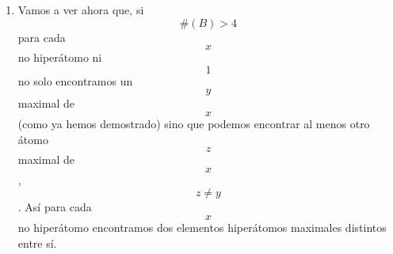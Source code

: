 \documentclass[
]{article}
\providecommand{\tightlist}{%
  \setlength{\itemsep}{0pt}\setlength{\parskip}{0pt}}
\begin{document}
\begin{enumerate}
\begin{enumerate}
\begin{enumerate}
\begin{enumerate}
\begin{enumerate}
          \begin{enumerate}
          \def\labelenumvi{\arabic{enumvi}.}
          \tightlist
          \item
            \[{y + \overline{y}} = 1\]
          \item
            \[{{x \cdot {({y + \overline{y}})}} = {x \cdot 1}} = x\]
          \item
            \[{{x = {{({x \cdot y})} + {({x \cdot \overline{y}})}}} = {{({x \cdot y})} + 0}} = y\]
          \item
            \[x = y\]. Absurdo. Habíamos asumido que
            \[{y \in \mathit{Atom}}{{{(B)} \land x} \notin \mathit{Atom}}{(B)}\].
          \end{enumerate}
        \end{enumerate}
      \item
        \[{{({x \cdot \overline{y}})} \cdot x} = {({x \cdot \overline{y}})}\]
      \item
        \[\exists{z \in \mathit{Atom}}{(B)}{{z \cdot {({x \cdot \overline{y}})}} = z}\]
      \item
        \[z \neq y\]

        \begin{enumerate}
        \def\labelenumv{\arabic{enumv}.}
        \tightlist
        \item
          Supongamos \[z = y\].
        \item
          \[{y = z} = {{({x \cdot \overline{y}})} \cdot z}\]
        \item
          \[{{{y = {{({{({x \cdot \overline{y}})} \cdot z})} \cdot y}} = {{({x \cdot z})} \cdot {({\overline{y} \cdot y})}}} = {{({x \cdot z})} \cdot 0}} = 0\]
        \item
          \[0 = y\]. Absurdo. Habíamos asumido que
          \[{y \in {B^{\ast} \land 0}} \notin B^{\ast}\].
        \end{enumerate}
      \item
        \[\exists{z \in {B \smallsetminus {\{ y\}}}}z\mathsf{\mathit{minimal}}x\].
      \item
        \[\exists{\mathit{yz} \in B}{{\left\lbrack {y\mathsf{\mathit{minimal}}x} \right\rbrack \land \left\lbrack {z\mathsf{\mathit{minimal}}x} \right\rbrack} \land \left\lbrack {y \neq x} \right\rbrack}\].
      \item
        \[\forall{x \in B^{\ast}}\exists{\mathit{yz} \in B}{{\left\lbrack {y\mathsf{\mathit{minimal}}x} \right\rbrack \land \left\lbrack {z\mathsf{\mathit{minimal}}x} \right\rbrack} \land \left\lbrack {y \neq x} \right\rbrack}\].
      \end{enumerate}
    \item
      Vamos a ver ahora que, si \[{\#{(B)}} > 4\] para cada \[x\] no
      hiperátomo ni \[1\] no solo encontramos un \[y\] maximal de
      \[x\](como ya hemos demostrado) sino que podemos encontrar al
      menos otro átomo \[z\] maximal de \[x\], \[z \neq y\]. Así para
      cada \[x\] no hiperátomo encontramos dos elementos hiperátomos
      maximales distintos entre sí.


\end{enumerate}
\end{enumerate}
\end{enumerate}
\end{document}
